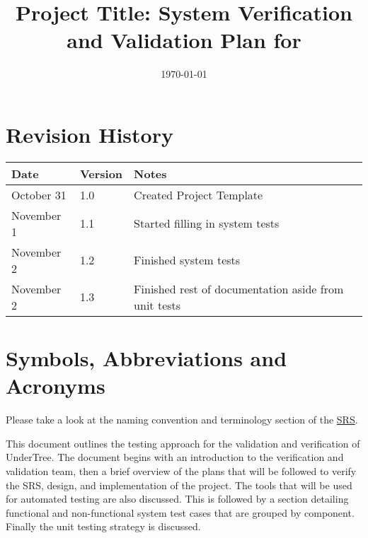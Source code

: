 \documentclass[12pt, titlepage]{article}
\begin{document}
	
	\title{Project Title: System Verification and Validation Plan for \progname{}} 
	\author{\authname}
	\date{\today}
	
	\maketitle
	
	
	\section{Revision History}
	
	\begin{tabularx}{\textwidth}{p{3cm}p{2cm}X}
		\toprule {\bf Date} & {\bf Version} & {\bf Notes}\\
		\midrule
		October 31 & 1.0 & Created Project Template\\
		November 1 & 1.1 & Started filling in system tests\\
		November 2 & 1.2 & Finished system tests\\
		November 2 & 1.3 & Finished rest of documentation aside from unit tests\\
		\bottomrule
	\end{tabularx}
	
	\newpage
	
	\tableofcontents
	
	\listoftables
	
	\newpage
	
	\section{Symbols, Abbreviations and Acronyms}
	
	Please take a look at the naming convention and terminology section of the \href{https://github.com/RutheniumVI/UnderTree/blob/main/docs/SRS/SRS.pdf}{SRS}.
	
	\newpage
	
	
	This document outlines the testing approach for the validation and verification of UnderTree. The document begins with an introduction to the verification and validation team, then a brief overview of the plans that will be followed to verify the SRS, design, and implementation of the project. The tools that will be used for automated testing are also discussed. This is followed by a section detailing functional and non-functional system test cases that are grouped by component. Finally the unit testing strategy is discussed. 
	
\end{document}
